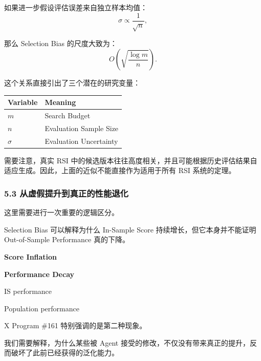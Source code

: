 如果进一步假设评估误差来自独立样本均值：
\[\sigma\propto\frac1{\sqrt n},\]

那么 Selection Bias 的尺度大致为：
\[O\left(
\sqrt{\frac{\log m}{n}}
\right).\]

这个关系直接引出了三个潜在的研究变量：

\begin{readertable}
\begin{longtable}[]{@{}
  >{\raggedright\arraybackslash}p{}
  >{\raggedright\arraybackslash}p{}@{}}
\toprule
Variable & Meaning \\
\midrule
\endhead
\(m\) & Search Budget \\
\(n\) & Evaluation Sample Size \\
\(\sigma\) & Evaluation Uncertainty \\
\bottomrule
\end{longtable}
\end{readertable}

需要注意，真实 RSI 中的候选版本往往高度相关，并且可能根据历史评估结果自适应生成。因此，上面的近似不能直接作为适用于所有 RSI 系统的定理。

\hypertarget{part-1-07-0001-ux4eceux865aux5047ux63d0ux5347ux5230ux771fux6b63ux7684ux6027ux80fdux9000ux5316}{%
\subsubsection{5.3 从虚假提升到真正的性能退化}\label{part-1-07-0001-ux4eceux865aux5047ux63d0ux5347ux5230ux771fux6b63ux7684ux6027ux80fdux9000ux5316}}

这里需要进行一次重要的逻辑区分。

Selection Bias 可以解释为什么 In-Sample Score 持续增长，但它本身并不能证明 Out-of-Sample Performance 真的下降。

\textbf{Score Inflation}


\textbf{Performance Decay}


IS performance

Population performance

X Program \#161 特别强调的是第二种现象。

我们需要解释，为什么某些被 Agent 接受的修改，不仅没有带来真正的提升，反而破坏了此前已经获得的泛化能力。


